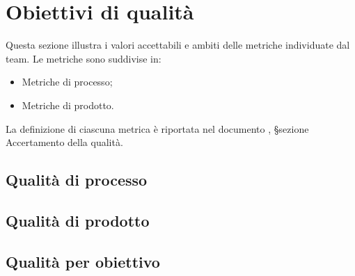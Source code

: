 \section{Obiettivi di qualità}


\par Questa sezione illustra i valori accettabili e ambiti delle metriche individuate dal team. Le metriche sono suddivise in:
\begin{itemize}
  \item Metriche di processo;
  \item Metriche di prodotto.
\end{itemize}

\par La definizione di ciascuna metrica è riportata nel documento \NormeDiProgetto, §sezione Accertamento della qualità.

\subsection{Qualità di processo}


\subsection{Qualità di prodotto}


\subsection{Qualità per obiettivo}
